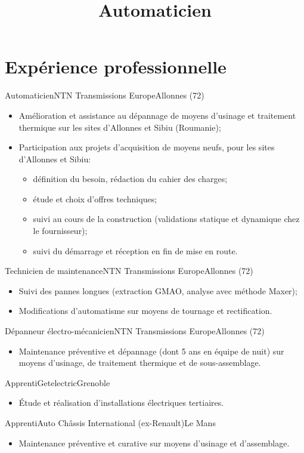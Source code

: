 \documentclass[a4paper,french,10pt]{moderncv}
\title{Automaticien}
\begin{document}
\maketitle{}

\section{Expérience professionnelle}
%
{Automaticien}{NTN Transmissions Europe}{Allonnes (72)}{}{%
  \begin{itemize}
    \item Amélioration et assistance au dépannage de moyens d'usinage et
          traitement thermique sur les sites d'Allonnes et Sibiu (Roumanie);
    \item Participation aux projets d'acquisition de moyens neufs, pour les
          sites d'Allonnes et Sibiu:
          \begin{itemize}
            \item définition du besoin, rédaction du cahier des charges;
            \item étude et choix d'offres techniques;
            \item suivi au cours de la construction (validations statique et
                  dynamique chez le fournisseur);
            \item suivi du démarrage et réception en fin de mise en route.
          \end{itemize}
  \end{itemize}
}
%
{Technicien de maintenance}{NTN Transmissions Europe}{Allonnes (72)}{}{%
  \begin{itemize}
    \item Suivi des pannes longues (extraction GMAO, analyse avec méthode
          Maxer);
    \item Modifications d'automatisme sur moyens de tournage et rectification.
  \end{itemize}
}
%
{Dépanneur électro-mécanicien}{NTN Transmissions Europe}{Allonnes (72)}{}{%
  \begin{itemize}
    \item Maintenance préventive et dépannage (dont 5 ans en équipe de nuit)
          sur moyens d'usinage, de traitement thermique et de sous-assemblage.
  \end{itemize}
}
%
{Apprenti}{Getelectric}{Grenoble}{}{%
  \begin{itemize}
    \item Étude et réalisation d'installations électriques tertiaires.
  \end{itemize}
}
%
{Apprenti}{Auto Châssis International (ex-Renault)}{Le Mans}{}{%
  \begin{itemize}
    \item Maintenance préventive et curative sur moyens d'usinage et
          d'assemblage.
  \end{itemize}
}
\end{document}
